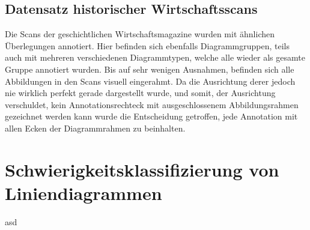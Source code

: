 \subsection*{Datensatz historischer Wirtschaftsscans}
Die Scans der geschichtlichen Wirtschaftsmagazine wurden mit ähnlichen Überlegungen annotiert. Hier befinden sich ebenfalls Diagrammgruppen, teils auch mit mehreren verschiedenen Diagrammtypen, welche alle wieder als gesamte Gruppe annotiert wurden. Bis auf sehr wenigen Ausnahmen, befinden sich alle Abbildungen in den Scans visuell eingerahmt. Da die Ausrichtung derer jedoch nie wirklich perfekt gerade dargestellt wurde, und somit, der Ausrichtung verschuldet, kein Annotationsrechteck mit ausgeschlossenem Abbildungsrahmen gezeichnet werden kann wurde die Entscheidung getroffen, jede Annotation mit allen Ecken der Diagrammrahmen zu beinhalten.

\newpage
\section{Schwierigkeitsklassifizierung von Liniendiagrammen}
asd